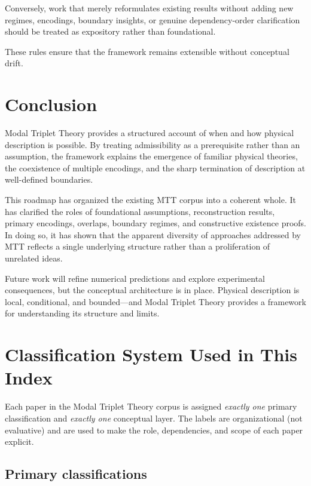 \documentclass[11pt]{article}
\begin{document}
Conversely, work that merely reformulates existing results without adding new regimes, encodings, boundary insights, or genuine dependency-order clarification should be treated as expository rather than foundational.

These rules ensure that the framework remains extensible without conceptual drift.

\section{Conclusion}

Modal Triplet Theory provides a structured account of when and how physical description is possible. By treating admissibility as a prerequisite rather than an assumption, the framework explains the emergence of familiar physical theories, the coexistence of multiple encodings, and the sharp termination of description at well-defined boundaries.

This roadmap has organized the existing MTT corpus into a coherent whole. It has clarified the roles of foundational assumptions, reconstruction results, primary encodings, overlaps, boundary regimes, and constructive existence proofs. In doing so, it has shown that the apparent diversity of approaches addressed by MTT reflects a single underlying structure rather than a proliferation of unrelated ideas.

Future work will refine numerical predictions and explore experimental consequences, but the conceptual architecture is in place. Physical description is local, conditional, and bounded—and Modal Triplet Theory provides a framework for understanding its structure and limits.

\section{Classification System Used in This Index}

Each paper in the Modal Triplet Theory corpus is assigned \emph{exactly one} primary
classification and \emph{exactly one} conceptual layer. The labels are organizational (not
evaluative) and are used to make the role, dependencies, and scope of each paper explicit.

\subsection{Primary classifications}
\end{document}
